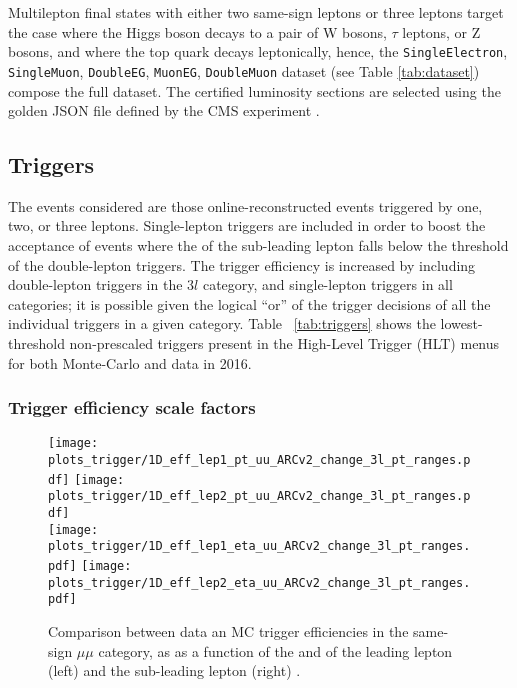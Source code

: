 Multilepton final states with either two same-sign leptons or three leptons target the case where the Higgs boson decays to a pair of W bosons, $\tau$ leptons, or Z bosons, and where the top quark decays leptonically, hence, the \verb|SingleElectron|, \verb|SingleMuon|, \verb|DoubleEG|, \verb|MuonEG|, \verb|DoubleMuon| dataset (see Table \ref{tab:dataset}) compose the full dataset. The certified luminosity sections are selected using the golden JSON file defined by the CMS experiment \cite{json}.

\subsection{Triggers}

The events considered are those online-reconstructed events triggered by one, two, or three leptons. Single-lepton triggers are included in order to boost the acceptance of events where the \pt of the sub-leading lepton falls below the threshold of the double-lepton triggers. The trigger efficiency is increased by including double-lepton triggers in the $3l$ category, and single-lepton triggers in all categories; it is possible given the logical ``or'' of the trigger decisions of all the individual triggers in a given category. Table ~\ref{tab:triggers} shows the lowest-threshold non-prescaled triggers present in the High-Level Trigger (HLT) menus for both Monte-Carlo and data in 2016.

\subsubsection*{Trigger efficiency scale factors}

\begin{figure}[htp]
\centering
\texttt{[image: plots\_trigger/1D\_eff\_lep1\_pt\_uu\_ARCv2\_change\_3l\_pt\_ranges.pdf]}
\texttt{[image: plots\_trigger/1D\_eff\_lep2\_pt\_uu\_ARCv2\_change\_3l\_pt\_ranges.pdf]} \\
\texttt{[image: plots\_trigger/1D\_eff\_lep1\_eta\_uu\_ARCv2\_change\_3l\_pt\_ranges.pdf]}
\texttt{[image: plots\_trigger/1D\_eff\_lep2\_eta\_uu\_ARCv2\_change\_3l\_pt\_ranges.pdf]}
\caption[Trigger efficiency for the same-sign $\mu\mu$ category]{Comparison between data an MC trigger efficiencies in the same-sign $\mu\mu$ category, as as a function of the \pt and  \etac of the leading lepton (left) and the sub-leading lepton (right) \cite{CMS_AN_2017-029}.}
\label{fig:trigeffsmumu}
\end{figure}

